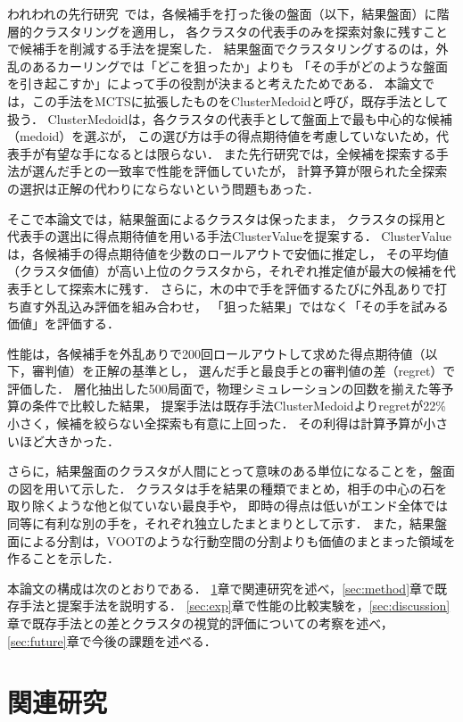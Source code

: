 \documentclass[submit]{ipsj}
\begin{document}
われわれの先行研究~\cite{naka_gi58}では，各候補手を打った後の盤面（以下，結果盤面）に階層的クラスタリングを適用し，
各クラスタの代表手のみを探索対象に残すことで候補手を削減する手法を提案した．
結果盤面でクラスタリングするのは，外乱のあるカーリングでは「どこを狙ったか」よりも
「その手がどのような盤面を引き起こすか」によって手の役割が決まると考えたためである．
本論文では，この手法をMCTSに拡張したものをClusterMedoidと呼び，既存手法として扱う．
ClusterMedoidは，各クラスタの代表手として盤面上で最も中心的な候補（medoid）を選ぶが，
この選び方は手の得点期待値を考慮していないため，代表手が有望な手になるとは限らない．
また先行研究では，全候補を探索する手法が選んだ手との一致率で性能を評価していたが，
計算予算が限られた全探索の選択は正解の代わりにならないという問題もあった．

そこで本論文では，結果盤面によるクラスタは保ったまま，
クラスタの採用と代表手の選出に得点期待値を用いる手法ClusterValueを提案する．
ClusterValueは，各候補手の得点期待値を少数のロールアウトで安価に推定し，
その平均値（クラスタ価値）が高い上位のクラスタから，それぞれ推定値が最大の候補を代表手として探索木に残す．
さらに，木の中で手を評価するたびに外乱ありで打ち直す外乱込み評価を組み合わせ，
「狙った結果」ではなく「その手を試みる価値」を評価する．

性能は，各候補手を外乱ありで200回ロールアウトして求めた得点期待値（以下，審判値）を正解の基準とし，
選んだ手と最良手との審判値の差（regret）で評価した．
層化抽出した500局面で，物理シミュレーションの回数を揃えた等予算の条件で比較した結果，
提案手法は既存手法ClusterMedoidよりregretが22\%小さく，候補を絞らない全探索も有意に上回った．
その利得は計算予算が小さいほど大きかった．

さらに，結果盤面のクラスタが人間にとって意味のある単位になることを，盤面の図を用いて示した．
クラスタは手を結果の種類でまとめ，相手の中心の石を取り除くような他と似ていない最良手や，
即時の得点は低いがエンド全体では同等に有利な別の手を，それぞれ独立したまとまりとして示す．
また，結果盤面による分割は，VOOTのような行動空間の分割よりも価値のまとまった領域を作ることを示した．

本論文の構成は次のとおりである．
\ref{sec:related}章で関連研究を述べ，\ref{sec:method}章で既存手法と提案手法を説明する．
\ref{sec:exp}章で性能の比較実験を，\ref{sec:discussion}章で既存手法との差とクラスタの視覚的評価についての考察を述べ，
\ref{sec:future}章で今後の課題を述べる．

\section{関連研究}
\label{sec:related}
\end{document}
